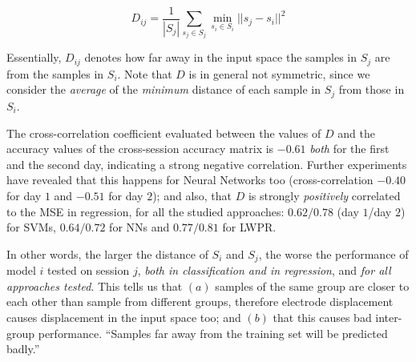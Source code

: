 $$ D_{ij} = \frac{1}{|S_j|} \sum_{s_j \in S_j}{\min_{s_i \in S_i}{ ||s_j-s_i||^2 } } $$

Essentially, $D_{ij}$ denotes how far away in the input space the
samples in $S_j$ are from the samples in $S_i$. Note that $D$ is in
general not symmetric, since we consider the \emph{average} of the
\emph{minimum} distance of each sample in $S_j$ from those in $S_i$.

The cross-correlation coefficient evaluated between the values of $D$
and the accuracy values of the cross-session accuracy matrix is
$-0.61$ \emph{both} for the first and the second day, indicating a
strong negative correlation. Further experiments have revealed that
this happens for Neural Networks too (cross-correlation $-0.40$ for
day $1$ and $-0.51$ for day $2$); and also, that $D$ is strongly
\emph{positively} correlated to the MSE in regression, for all the
studied approaches: $0.62/0.78$ (day $1$/day $2$) for SVMs,
$0.64/0.72$ for NNs and $0.77/0.81$ for LWPR.

In other words, the larger the distance of $S_i$ and $S_j$, the worse
the performance of model $i$ tested on session $j$, \emph{both in
classification and in regression}, and \emph{for all approaches
tested}. This tells us that $(a)$ samples of the same group are closer
to each other than sample from different groups, therefore electrode
displacement causes displacement in the input space too; and $(b)$
that this causes bad inter-group performance. ``Samples far away from
the training set will be predicted badly.''



